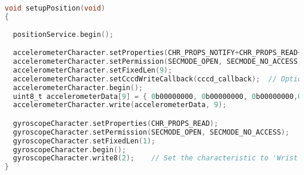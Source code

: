 \begin{lstlisting}[float,language=C,caption=Tập lệnh khởi tạo các thuộc tính GATT, label=gattBle,captionpos=b]
void setupPosition(void)
{
 
  positionService.begin();

  accelerometerCharacter.setProperties(CHR_PROPS_NOTIFY+CHR_PROPS_READ+CHR_PROPS_WRITE );
  accelerometerCharacter.setPermission(SECMODE_OPEN, SECMODE_NO_ACCESS);
  accelerometerCharacter.setFixedLen(9);
  accelerometerCharacter.setCccdWriteCallback(cccd_callback);  // Optionally capture CCCD updates
  accelerometerCharacter.begin();
  uint8_t accelerometerData[9] = { 0b00000000, 0b00000000, 0b00000000,0b00000000,0b00000000,0b00000000,0b00000000,0b00000000,0b00000000}; // Set the characteristic to use 8-bit values, with the sensor connected and detected
  accelerometerCharacter.write(accelerometerData, 9);

  gyroscopeCharacter.setProperties(CHR_PROPS_READ);
  gyroscopeCharacter.setPermission(SECMODE_OPEN, SECMODE_NO_ACCESS);
  gyroscopeCharacter.setFixedLen(1);
  gyroscopeCharacter.begin();
  gyroscopeCharacter.write8(2);    // Set the characteristic to 'Wrist' (2)
}

\end{lstlisting}
